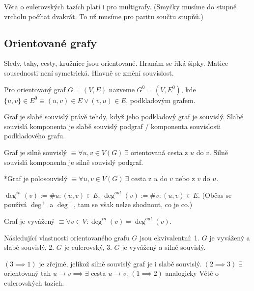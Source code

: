 \documentclass[12pt]{article}					%
\begin{document}
    \begin{poznamka}
        Věta o eulerovských tazích platí i pro multigrafy. (Smyčky musíme do stupně vrcholu počítat dvakrát. To už musíme pro paritu součtu stupňů.)
    \end{poznamka}

    \subsection{Orientované grafy}
        \begin{poznamka}[Co se změnilo]
            Sledy, tahy, cesty, kružnice jsou orientované. Hranám se říká šipky. Matice sousednosti není symetrická. Hlavně se změní souvislost.
        \end{poznamka}

        \begin{definice}
            Pro orientovaný graf $G=(V, E)$ nazveme $G^0 = (V, E^0)$, kde $\{u, v\} \in E^0 ≡ (u, v) \in E \lor (v, u) \in E$, podkladovým grafem.

            Graf je slabě souvislý právě tehdy, když jeho podkladový graf je souvislý. Slabě souvislá komponenta je slabě souvislý podgraf / komponenta souvislosti podkladového grafu.

            Graf je silně souvislý $≡ \forall u, v \in V(G)\ \exists$ orientovaná cesta z $u$ do $v$. Silně souvislá komponenta je silně souvislý podgraf.

            *Graf je polosouvislý $≡ \forall u, v \in V(G)\ \exists$ cesta z $u$ do $v$ nebo z $v$ do $u$.
        \end{definice}

        \begin{definice}[Stupně]
                $\deg^{in}(v) := \#u: (u, v) \in E$, $\deg^{out}(v) := \#v: (u, v) \in E$. (Občas se používá $\deg^+$ a $\deg^-$, tam se však nelze shodnout, co je co.)
        \end{definice}

        \begin{definice}
            Graf je vyvážený $≡ \forall v \in V: \deg^{in}(v) = \deg^{out}(v)$.
        \end{definice}

        \begin{veta}
            Následující vlastnosti orientovaného grafu $G$ jsou ekvivalentní: 1. $G$ je vyvážený a slabě souvislý, 2. $G$ je eulerovský, 3. $G$ je vyvážený a silně souvislý.
            \begin{dukazin}
                $(3\implies 1)$ je zřejmé, jelikož silně souvislý graf je i slabě souvislý. $(2 \implies 3)$ $\exists$ orientovaný tah $u\rightarrow v \implies \exists$ cesta $u \rightarrow v$. $(1 \implies 2)$ analogicky Větě o eulerovských tazích. 
            \end{dukazin}
        \end{veta}
\end{document}
